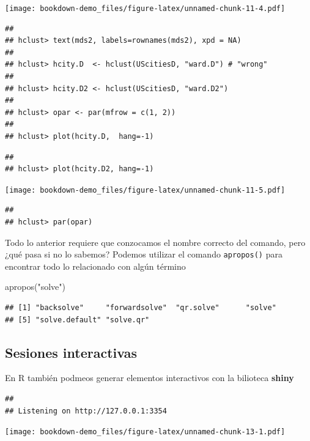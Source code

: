 \documentclass[
]{book}
\newenvironment{Shaded}{\begin{snugshade}}{\end{snugshade}}
\newcommand{\FunctionTok}[1]{\textcolor[rgb]{0.00,0.00,0.00}{#1}}
\newcommand{\NormalTok}[1]{#1}
\newcommand{\StringTok}[1]{\textcolor[rgb]{0.31,0.60,0.02}{#1}}
\begin{document}
\texttt{[image: bookdown-demo\_files/figure-latex/unnamed-chunk-11-4.pdf]}

\begin{verbatim}
## 
## hclust> text(mds2, labels=rownames(mds2), xpd = NA)
## 
## hclust> hcity.D  <- hclust(UScitiesD, "ward.D") # "wrong"
## 
## hclust> hcity.D2 <- hclust(UScitiesD, "ward.D2")
## 
## hclust> opar <- par(mfrow = c(1, 2))
## 
## hclust> plot(hcity.D,  hang=-1)
\end{verbatim}

\begin{verbatim}
## 
## hclust> plot(hcity.D2, hang=-1)
\end{verbatim}

\texttt{[image: bookdown-demo\_files/figure-latex/unnamed-chunk-11-5.pdf]}

\begin{verbatim}
## 
## hclust> par(opar)
\end{verbatim}

Todo lo anterior requiere que conzocamos el nombre correcto del comando, pero ¿qué pasa si no lo sabemos?
Podemos utilizar el comando \texttt{apropos()} para encontrar todo lo relacionado con algún término

\begin{Shaded}
\begin{Highlighting}[]
\FunctionTok{apropos}\NormalTok{(}\StringTok{"solve"}\NormalTok{)}
\end{Highlighting}
\end{Shaded}

\begin{verbatim}
## [1] "backsolve"     "forwardsolve"  "qr.solve"      "solve"        
## [5] "solve.default" "solve.qr"
\end{verbatim}

\hypertarget{sesiones-interactivas}{%
\subsection{Sesiones interactivas}\label{sesiones-interactivas}}

En R también podmeos generar elementos interactivos con la bilioteca \textbf{shiny}

\begin{verbatim}
## 
## Listening on http://127.0.0.1:3354
\end{verbatim}

\texttt{[image: bookdown-demo\_files/figure-latex/unnamed-chunk-13-1.pdf]}
\end{document}

